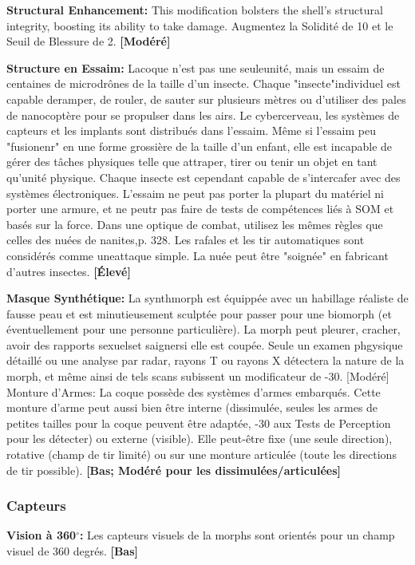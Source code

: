 \textbf{Structural Enhancement:} This modification bolsters the shell’s structural integrity, boosting its ability to take damage. Augmentez la Solidité de 10 et le Seuil de Blessure de 2. \textbf{[Modéré]} 

\textbf{Structure en Essaim:} Lacoque n'est pas une seuleunité, mais un essaim de centaines de microdrônes de la taille d'un insecte. Chaque "insecte"individuel est capable deramper, de rouler, de sauter sur plusieurs mètres ou d'utiliser des pales de nanocoptère pour se propulser dans les airs. Le cybercerveau, les systèmes de capteurs et les implants sont distribués dans l'essaim. Même si l'essaim peu "fusionenr" en une forme grossière de la taille d'un enfant, elle est incapable de gérer des tâches physiques telle que attraper, tirer ou tenir un objet en tant qu'unité physique. Chaque insecte est cependant capable de s'intercafer avec des systèmes électroniques. L'essaim ne peut pas porter la plupart du matériel ni porter une armure, et ne peutr pas faire de tests de compétences liés à SOM et basés sur la force. Dans une optique de combat, utilisez les mêmes règles que celles des nuées de nanites,p. 328. Les rafales et les tir automatiques sont considérés comme uneattaque simple. La nuée peut être "soignée" en fabricant d'autres insectes. \textbf{[Élevé]} 

\textbf{Masque Synthétique:} La synthmorph est équippée avec un habillage réaliste de fausse peau et est minutieusement sculptée pour passer pour une biomorph (et éventuellement pour une personne particulière). La morph peut pleurer, cracher, avoir des rapports sexuelset saignersi elle est coupée. Seule un examen phgysique détaillé ou une analyse par radar, rayons T ou rayons X détectera la nature de la morph, et même ainsi de tels scans subissent un modificateur de -30. [Modéré] Monture d'Armes: La coque possède des systèmes d'armes embarqués. Cette monture d'arme peut aussi bien être interne (dissimulée, seules les armes de petites tailles pour la coque peuvent être adaptée, -30 aux Tests de Perception pour les détecter) ou externe (visible). Elle peut-être fixe (une seule direction), rotative (champ de tir limité) ou sur une monture articulée (toute les directions de tir possible). \textbf{[Bas; Modéré pour les dissimulées/articulées]} 

\subsubsection{Capteurs} 

\textbf{{Vision à 360$^{\circ}$:}} Les capteurs visuels de la morphs sont orientés pour un champ visuel de 360 degrés. \textbf{[Bas]} 

